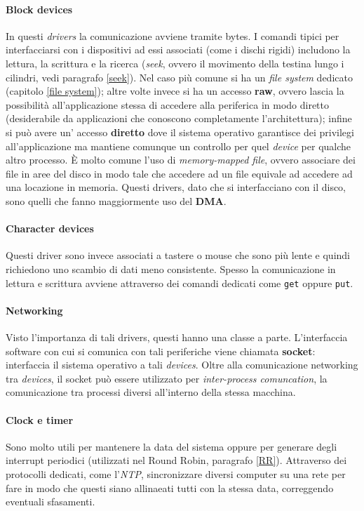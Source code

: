 \paragraph{Block devices} In questi \textit{drivers} la comunicazione avviene tramite bytes. I comandi tipici per interfacciarsi con i dispositivi ad essi associati (come i dischi rigidi) includono la lettura, la scrittura e la ricerca (\textit{seek}, ovvero il movimento della testina lungo i cilindri, vedi paragrafo \ref{seek}). Nel caso più comune si ha un \textit{file system} dedicato (capitolo \ref{file system}); altre volte invece si ha un accesso \textbf{raw}, ovvero lascia la possibilità all'applicazione stessa di accedere alla periferica in modo diretto (desiderabile da applicazioni che conoscono completamente l'architettura); infine si può avere un' accesso \textbf{diretto} dove il sistema operativo garantisce dei privilegi all'applicazione ma mantiene comunque un controllo per quel \textit{device} per qualche altro processo. È molto comune l'uso di \textit{memory-mapped file}, ovvero associare dei file in aree del disco in modo tale che accedere ad un file equivale ad accedere ad una locazione in memoria. Questi drivers, dato che si interfacciano con il disco, sono quelli che fanno maggiormente uso del \textbf{DMA}.

\paragraph{Character devices} Questi driver sono invece associati a tastere o mouse che sono più lente e quindi richiedono uno scambio di dati meno consistente. Spesso la comunicazione in lettura e scrittura avviene attraverso dei comandi dedicati come \texttt{get} oppure \texttt{put}.

\paragraph{Networking} Visto l'importanza di tali drivers, questi hanno una classe a parte. L'interfaccia software con cui si comunica con tali periferiche viene chiamata \textbf{socket}: interfaccia il sistema operativo a tali \textit{devices}. Oltre alla comunicazione networking tra \textit{devices}, il socket può essere utilizzato per \textit{inter-process comuncation}, la comunicazione tra processi diversi all'interno della stessa macchina.

\paragraph{Clock e timer} Sono molto utili per mantenere la data del sistema oppure per generare degli interrupt periodici (utilizzati nel Round Robin, paragrafo \ref{RR}). Attraverso dei protocolli dedicati, come l'\textit{NTP}, sincronizzare diversi computer su una rete per fare in modo che questi siano allinaeati tutti con la stessa data, correggendo eventuali sfasamenti.

